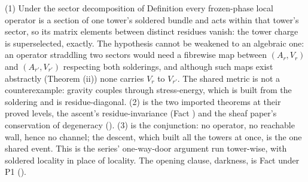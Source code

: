 (1) Under the sector decomposition of Definition  every frozen-phase local operator is a section of one tower's soldered bundle and acts within that tower's sector, so its matrix elements between distinct residues vanish: the tower charge is superselected, exactly. The hypothesis cannot be weakened to an algebraic one: an operator straddling two sectors would need a fibrewise map between $(A_{r}, V_{r})$ and $(A_{r'}, V_{r'})$ respecting both solderings, and although such maps exist abstractly (Theorem (ii)) none carries $V_{r}$ to $V_{r'}$. The shared metric is not a counterexample: gravity couples through stress-energy, which is built from the soldering and is residue-diagonal. (2) is the two imported theorems at their proved levels, the ascent's residue-invariance (Fact ) and the sheaf paper's conservation of degeneracy (). (3) is the conjunction: no operator, no reachable wall, hence no channel; the descent, which built all the towers at once, is the one shared event. This is the series' one-way-door argument run tower-wise, with soldered locality in place of locality. The opening clause, darkness, is Fact  under P1 ().
